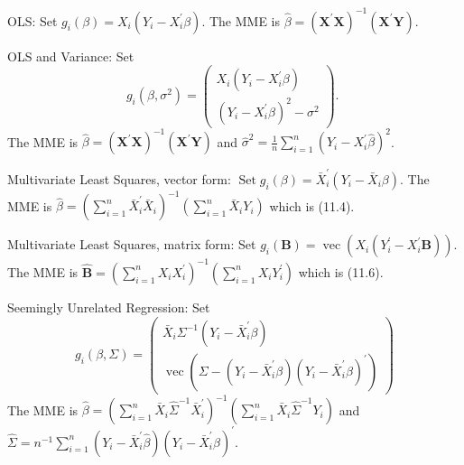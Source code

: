 \documentclass[10pt]{article}
\begin{document}
OLS: Set $g_{i}(\beta)=X_{i}\left(Y_{i}-X_{i}^{\prime} \beta\right)$. The MME is $\widehat{\beta}=\left(\boldsymbol{X}^{\prime} \boldsymbol{X}\right)^{-1}\left(\boldsymbol{X}^{\prime} \boldsymbol{Y}\right)$.

OLS and Variance: Set
$$
g_{i}\left(\beta, \sigma^{2}\right)=\left(\begin{array}{c}
X_{i}\left(Y_{i}-X_{i}^{\prime} \beta\right) \\
\left(Y_{i}-X_{i}^{\prime} \beta\right)^{2}-\sigma^{2}
\end{array}\right) \text {. }
$$
The MME is $\widehat{\beta}=\left(\boldsymbol{X}^{\prime} \boldsymbol{X}\right)^{-1}\left(\boldsymbol{X}^{\prime} \boldsymbol{Y}\right)$ and $\widehat{\sigma}^{2}=\frac{1}{n} \sum_{i=1}^{n}\left(Y_{i}-X_{i}^{\prime} \widehat{\beta}\right)^{2}$.

Multivariate Least Squares, vector form: $\operatorname{Set} g_{i}(\beta)=\bar{X}_{i}^{\prime}\left(Y_{i}-\bar{X}_{i} \beta\right)$. The MME is $\widehat{\beta}=\left(\sum_{i=1}^{n} \bar{X}_{i}^{\prime} \bar{X}_{i}\right)^{-1}\left(\sum_{i=1}^{n} \bar{X}_{i} Y_{i}\right)$ which is (11.4).

Multivariate Least Squares, matrix form: Set $g_{i}(\boldsymbol{B})=\operatorname{vec}\left(X_{i}\left(Y_{i}^{\prime}-X_{i}^{\prime} \boldsymbol{B}\right)\right)$. The MME is $\widehat{\boldsymbol{B}}=\left(\sum_{i=1}^{n} X_{i} X_{i}^{\prime}\right)^{-1}\left(\sum_{i=1}^{n} X_{i} Y_{i}^{\prime}\right)$ which is (11.6).

Seemingly Unrelated Regression: Set
$$
g_{i}(\beta, \Sigma)=\left(\begin{array}{c}
\bar{X}_{i} \Sigma^{-1}\left(Y_{i}-\bar{X}_{i}^{\prime} \beta\right) \\
\operatorname{vec}\left(\Sigma-\left(Y_{i}-\bar{X}_{i}^{\prime} \beta\right)\left(Y_{i}-\bar{X}_{i}^{\prime} \beta\right)^{\prime}\right)
\end{array}\right)
$$
The MME is $\widehat{\beta}=\left(\sum_{i=1}^{n} \bar{X}_{i} \widehat{\Sigma}^{-1} \bar{X}_{i}^{\prime}\right)^{-1}\left(\sum_{i=1}^{n} \bar{X}_{i} \widehat{\Sigma}^{-1} Y_{i}\right)$ and $\widehat{\Sigma}=n^{-1} \sum_{i=1}^{n}\left(Y_{i}-\bar{X}_{i}^{\prime} \widehat{\beta}\right)\left(Y_{i}-\bar{X}_{i}^{\prime} \widehat{\beta}\right)^{\prime}$.
\end{document}
